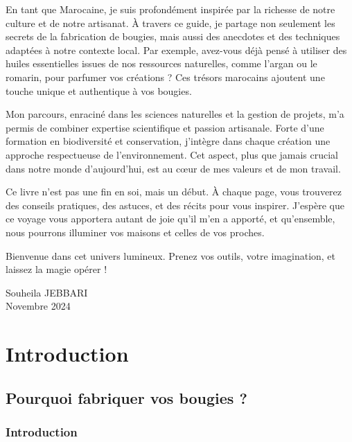\documentclass[11pt,fleqn,onecolumn,oneside]{book}
\begin{document}
\vspace{0.5cm}

\noindent En tant que Marocaine, je suis profondément inspirée par la richesse de notre culture et de notre artisanat. À travers ce guide, je partage non seulement les secrets de la fabrication de bougies, mais aussi des anecdotes et des techniques adaptées à notre contexte local. Par exemple, avez-vous déjà pensé à utiliser des huiles essentielles issues de nos ressources naturelles, comme l’argan ou le romarin, pour parfumer vos créations ? Ces trésors marocains ajoutent une touche unique et authentique à vos bougies.

\vspace{0.5cm}

\noindent Mon parcours, enraciné dans les sciences naturelles et la gestion de projets, m’a permis de combiner expertise scientifique et passion artisanale. Forte d’une formation en biodiversité et conservation, j’intègre dans chaque création une approche respectueuse de l’environnement. Cet aspect, plus que jamais crucial dans notre monde d’aujourd’hui, est au cœur de mes valeurs et de mon travail.

\vspace{0.5cm}

\noindent Ce livre n’est pas une fin en soi, mais un début. À chaque page, vous trouverez des conseils pratiques, des astuces, et des récits pour vous inspirer. J’espère que ce voyage vous apportera autant de joie qu’il m’en a apporté, et qu’ensemble, nous pourrons illuminer vos maisons et celles de vos proches.

\vspace{1cm}

\noindent Bienvenue dans cet univers lumineux. Prenez vos outils, votre imagination, et laissez la magie opérer !

\vspace{1.5cm}

\hfill Souheila JEBBARI \\
\hfill Novembre 2024

\part{Introduction}


\chapter{Pourquoi fabriquer vos bougies ?}

\section{Introduction}
\end{document}
